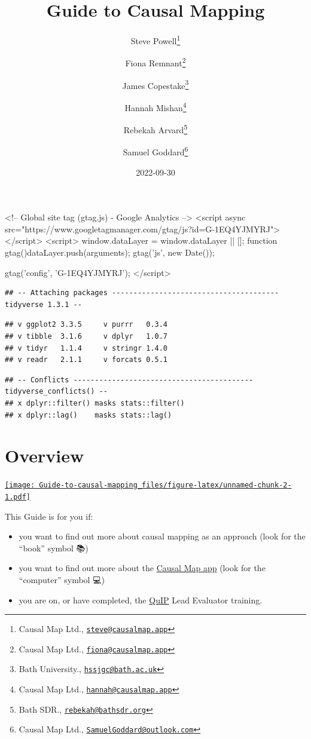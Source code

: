 \documentclass[
]{book}
\title{Guide to Causal Mapping}
\author{Steve Powell\footnote{Causal Map Ltd., \href{mailto:steve@causalmap.app}{\nolinkurl{steve@causalmap.app}}} \and Fiona Remnant\footnote{Causal Map Ltd., \href{mailto:fiona@causalmap.app}{\nolinkurl{fiona@causalmap.app}}} \and James Copestake\footnote{Bath University., \href{mailto:hssjgc@bath.ac.uk}{\nolinkurl{hssjgc@bath.ac.uk}}} \and Hannah Mishan\footnote{Causal Map Ltd., \href{mailto:hannah@causalmap.app}{\nolinkurl{hannah@causalmap.app}}} \and Rebekah Arvard\footnote{Bath SDR., \href{mailto:rebekah@bathsdr.org}{\nolinkurl{rebekah@bathsdr.org}}} \and Samuel Goddard\footnote{Causal Map Ltd., \href{mailto:SamuelGoddard@outlook.com}{\nolinkurl{SamuelGoddard@outlook.com}}}}
\date{2022-09-30}
\newenvironment{Shaded}{\begin{snugshade}}{\end{snugshade}}
\newcommand{\AttributeTok}[1]{\textcolor[rgb]{0.77,0.63,0.00}{#1}}
\newcommand{\FunctionTok}[1]{\textcolor[rgb]{0.00,0.00,0.00}{#1}}
\newcommand{\NormalTok}[1]{#1}
\newcommand{\SpecialCharTok}[1]{\textcolor[rgb]{0.00,0.00,0.00}{#1}}
\providecommand{\tightlist}{%
  \setlength{\itemsep}{0pt}\setlength{\parskip}{0pt}}
\begin{document}
\maketitle

<!-- Global site tag (gtag.js) - Google Analytics -->
<script async src="https://www.googletagmanager.com/gtag/js?id=G-1EQ4YJMYRJ"></script>
<script>
  window.dataLayer = window.dataLayer || [];
  function gtag(){dataLayer.push(arguments);}
  gtag('js', new Date());

  gtag('config', 'G-1EQ4YJMYRJ');
</script>

{
\setcounter{tocdepth}{1}
\tableofcontents
}
\begin{Shaded}
\end{Shaded}

\begin{verbatim}
## -- Attaching packages --------------------------------------- tidyverse 1.3.1 --
\end{verbatim}

\begin{verbatim}
## v ggplot2 3.3.5     v purrr   0.3.4
## v tibble  3.1.6     v dplyr   1.0.7
## v tidyr   1.1.4     v stringr 1.4.0
## v readr   2.1.1     v forcats 0.5.1
\end{verbatim}

\begin{verbatim}
## -- Conflicts ------------------------------------------ tidyverse_conflicts() --
## x dplyr::filter() masks stats::filter()
## x dplyr::lag()    masks stats::lag()
\end{verbatim}

\hypertarget{overview}{%
\chapter{Overview}\label{overview}}

\href{https://player.vimeo.com/video/689223728}{\texttt{[image: Guide-to-causal-mapping\_files/figure-latex/unnamed-chunk-2-1.pdf]}}

This Guide is for you if:

\begin{itemize}
\tightlist
\item
  you want to find out more about causal mapping as an approach (look for the ``book'' symbol 📚)
\item
  you want to find out more about the \href{https://causalmap.app/}{Causal Map app} (look for the ``computer'' symbol 💻)
\item
  you are on, or have completed, the \href{https://bathsdr.org/about-the-quip/}{QuIP} Lead Evaluator training.
\end{itemize}
\end{document}
